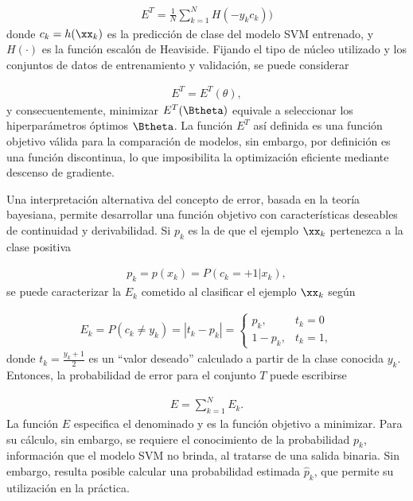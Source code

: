 \begin{align*}
\label{E^V}
  E^T = \frac{1}{N}\sum_{k=1}^{N} H(-{y}_k {c}_k))
\end{align*}
donde $c_k=h(\xx_k)$ es la predicción de clase del modelo SVM
entrenado, y $H(\cdot)$ es la función escalón de Heaviside.  Fijando
el tipo de núcleo utilizado y los conjuntos de datos de entrenamiento
y validación, se puede considerar

\begin{align*}
  E^T = E^T(\theta),
\end{align*}
y consecuentemente, minimizar $E^T(\Btheta)$ equivale a seleccionar
los hiperparámetros óptimos $\Btheta$. La función $E^T$ así definida
es una función objetivo válida para la comparación de modelos, sin
embargo, por definición es una función discontinua, lo que
imposibilita la optimización eficiente mediante descenso de gradiente.

Una interpretación alternativa del concepto de error, basada en la
teoría bayesiana, permite desarrollar una función objetivo con
características deseables de continuidad y derivabilidad.  Si $p_k$ es
la  de que el ejemplo $\xx_k$ pertenezca
a la clase positiva

\begin{align}
  p_k = p(x_k) = P(c_k=+1|x_k), %
\end{align}
se puede caracterizar la  $E_k$ cometido al
clasificar el ejemplo $\xx_k$ según

\begin{align}
\label{Ek}
  E_k = P(c_k\neq y_k) = |t_k-{p}_k| =
  \begin{cases}
    {p}_k, & t_k=0\\ 1-{p}_k, & t_k = 1,
  \end{cases}
\end{align}
donde $t_k=\frac{y_k+1}{2}$ es un ``valor deseado'' calculado a partir
de la clase conocida $y_k$.  Entonces, la probabilidad de error para
el conjunto $T$ puede escribirse

\begin{align}
\label{Err1}
  E = \sum_{k=1}^{N} E_k.
\end{align}
La función $E$ especifica el denominado  y es la
función objetivo a minimizar.  Para su cálculo, sin embargo, se
requiere el conocimiento de la probabilidad $p_k$, información que el
modelo SVM no brinda, al tratarse de una salida binaria.  Sin embargo,
resulta posible calcular una probabilidad estimada $\hat{p}_k$, que
permite su utilización en la práctica.

